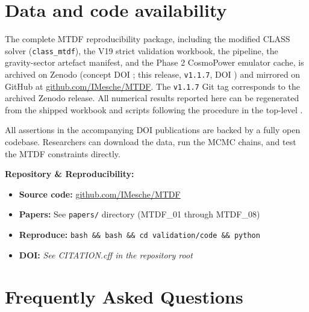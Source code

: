 \documentclass[11pt,a4paper]{article}
\begin{document}
\section{Data and code availability}
The complete MTDF reproducibility package, including the modified CLASS solver
(\texttt{class\_\allowbreak{}mtdf}), the V19 strict validation workbook, the
\texttt{{\small\protect{}}} pipeline, the gravity-sector artefact manifest,
and the Phase 2 CosmoPower emulator cache, is archived on Zenodo
(concept DOI \href{https://doi.org/10.5281/zenodo.19741058}{{\small\protect{}}};
this release, \texttt{v1.1.7}, DOI
\href{https://doi.org/10.5281/zenodo.21525855}{{\small\protect{}}})
and mirrored on GitHub at
\href{https://github.com/IMesche/MTDF}{github.com/\allowbreak{}IMesche/\allowbreak{}MTDF}.
The \texttt{v1.1.7} Git tag corresponds to the archived Zenodo release. All
numerical results reported here can be regenerated from the shipped workbook
and scripts following the procedure in the top-level \texttt{{\small\protect{}}}.

All assertions in the accompanying DOI publications are backed by a fully open codebase. Researchers can download the data, run the MCMC chains, and test the MTDF constraints directly.

\begin{mdframed}[linecolor=accent,linewidth=0.5pt,backgroundcolor=callout-bg,leftline=true,rightline=true,topline=true,bottomline=true,innerleftmargin=8pt,innerrightmargin=8pt,innertopmargin=6pt,innerbottommargin=6pt]
\textbf{Repository \& Reproducibility:}\begin{itemize}
  \item \textbf{Source code:} \href{https://github.com/IMesche/MTDF}{github.com/\allowbreak{}IMesche/\allowbreak{}MTDF}
  \item \textbf{Papers:} See \texttt{papers/\allowbreak{}} directory (MTDF\_\allowbreak{}01 through MTDF\_\allowbreak{}08)
  \item \textbf{Reproduce:} \texttt{bash {\small\protect{}} \&\& bash {\small\protect{}} \&\& cd validation/\allowbreak{}code \&\& python {\small\protect{}}}
  \item \textbf{DOI:} \emph{See CITATION.cff in the repository root}
\end{itemize}
\end{mdframed}

\section{Frequently Asked Questions}
\end{document}
